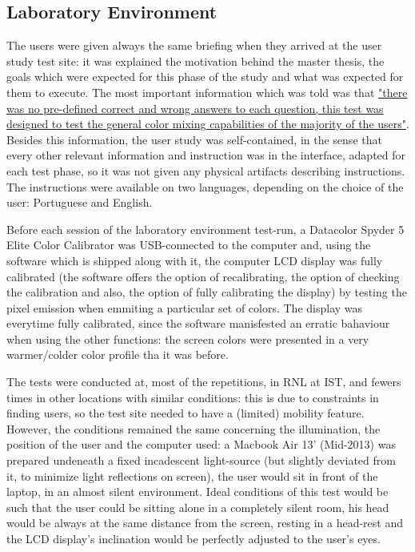 \subsection{Laboratory Environment}
%
The users were given always the same briefing when they arrived at the user study test site: it was explained the motivation behind the master
thesis, the goals which were expected for this phase of the study and what was expected for them to execute. The most important information which
was told was that \ul{"there was no pre-defined correct and wrong answers to each question, this test was designed to test the general
color mixing capabilities of the majority of the users"}. Besides this information, the user study was self-contained, in the sense that
every other relevant information and instruction was in the interface, adapted for each test phase, so it was not given any physical artifacts
describing instructions. The instructions were available on two languages, depending on the choice of the user: Portuguese and English. \par
%
Before each session of the laboratory environment test-run, a Datacolor Spyder 5 Elite Color Calibrator was USB-connected to the computer and, using
the software which is shipped along with it, the computer LCD display was fully calibrated (the software offers the option of recalibrating,
the option of checking the calibration and also, the option of fully calibrating the display) by testing the pixel emission when emmiting a particular
set of colors. The display was everytime fully calibrated, since the software manisfested an erratic bahaviour when using the other functions:
the screen colors were presented in a very warmer/colder color profile tha it was before. \par
%
The tests were conducted at, most of the repetitions, in \gls{RNL} at \gls{IST}, and fewers times in other locations with similar conditions:
this is due to constraints in finding users, so the test site needed to have a (limited) mobility feature. However, the conditions remained
the same concerning the illumination, the position of the user and the computer used: a Macbook Air 13' (Mid-2013) was prepared undeneath
a fixed incadescent light-source (but slightly deviated from it, to minimize light reflections on screen), the user would sit in front
of the laptop, in an almost silent environment. Ideal conditions of this test would be such that the user could be sitting alone in a completely
silent room, his head would be always at the same distance from the screen, resting in a head-rest and the LCD display's inclination would be perfectly
adjusted to the user's eyes. \par
%
